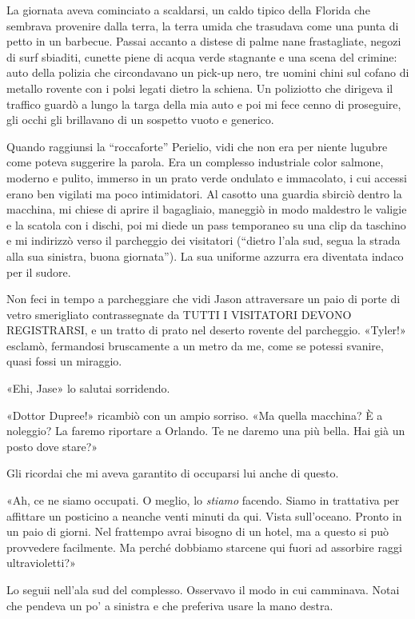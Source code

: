 La giornata aveva cominciato a scaldarsi, un caldo tipico della Florida
che sembrava provenire dalla terra, la terra umida che trasudava come
una punta di petto in un barbecue. Passai accanto a distese di palme
nane frastagliate, negozi di surf sbiaditi, cunette piene di acqua verde
stagnante e una scena del crimine: auto della polizia che circondavano
un pick-up nero, tre uomini chini sul cofano di metallo rovente con i
polsi legati dietro la schiena. Un poliziotto che dirigeva il traffico
guardò a lungo la targa della mia auto e poi mi fece cenno di
proseguire, gli occhi gli brillavano di un sospetto vuoto e generico.

\separatorefiori

Quando raggiunsi la ``roccaforte'' Perielio, vidi che non era per niente
lugubre come poteva suggerire la parola. Era un complesso industriale
color salmone, moderno e pulito, immerso in un prato verde ondulato e
immacolato, i cui accessi erano ben vigilati ma poco intimidatori. Al
casotto una guardia sbirciò dentro la macchina, mi chiese di aprire il
bagagliaio, maneggiò in modo maldestro le valigie e la scatola con i
dischi, poi mi diede un pass temporaneo su una clip da taschino e mi
indirizzò verso il parcheggio dei visitatori (``dietro l'ala sud, segua
la strada alla sua sinistra, buona giornata''). La sua uniforme azzurra
era diventata indaco per il sudore.

Non feci in tempo a parcheggiare che vidi Jason attraversare un paio di
porte di vetro smerigliato contrassegnate da {TUTTI I VISITATORI DEVONO
	REGISTRARSI}, e un tratto di prato nel deserto rovente del parcheggio.
«Tyler!» esclamò, fermandosi bruscamente a un metro da me, come se
potessi svanire, quasi fossi un miraggio.

«Ehi, Jase» lo salutai sorridendo.

«Dottor Dupree!» ricambiò con un ampio sorriso. «Ma quella macchina? È a
noleggio? La faremo riportare a Orlando. Te ne daremo una più bella. Hai
già un posto dove stare?»

Gli ricordai che mi aveva garantito di occuparsi lui anche di questo.

«Ah, ce ne siamo occupati. O meglio, lo \emph{stiamo} facendo. Siamo in
trattativa per affittare un posticino a neanche venti minuti da qui.
Vista sull'oceano. Pronto in un paio di giorni. Nel frattempo avrai
bisogno di un hotel, ma a questo si può provvedere facilmente. Ma perché
dobbiamo starcene qui fuori ad assorbire raggi ultravioletti?»

Lo seguii nell'ala sud del complesso. Osservavo il modo in cui
camminava. Notai che pendeva un po' a sinistra e che preferiva usare la
mano destra.

